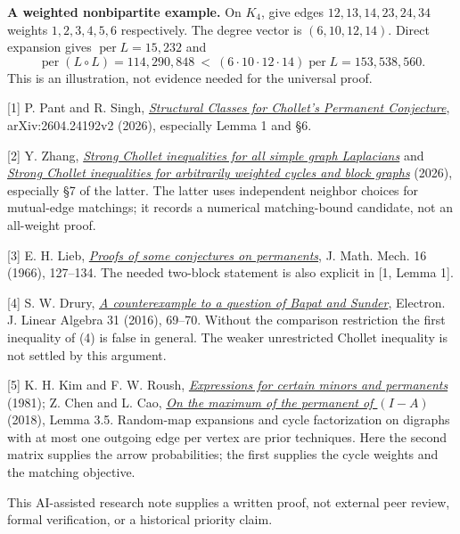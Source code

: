 \documentclass[11pt]{article}
\newcommand{\shead}[1]{\par\vspace{4pt}{\large\bfseries\sffamily\color{ink}#1}\par}
\newcommand{\per}{\operatorname{per}}
\begin{document}
\textbf{A weighted nonbipartite example.} On $K_4$, give edges $12,13,14,23,24,34$ weights $1,2,3,4,5,6$ respectively. The degree vector is $(6,10,12,14)$. Direct expansion gives $\per L=15{,}232$ and
\[
 \per(L\circ L)=114{,}290{,}848
 \ <\ (6\cdot10\cdot12\cdot14)\per L=153{,}538{,}560 .
\]
This is an illustration, not evidence needed for the universal proof.
\shead{Sources and limits}
{\small
[1] P. Pant and R. Singh, \href{https://arxiv.org/html/2604.24192v2}{\emph{Structural Classes for Chollet's Permanent Conjecture}}, arXiv:2604.24192v2 (2026), especially Lemma 1 and \S6.

[2] Y. Zhang, \href{https://github.com/mxym/math/tree/main/preprints/all-graph-chollet-2026-10}{\emph{Strong Chollet inequalities for all simple graph Laplacians}} and \href{https://github.com/mxym/math/blob/main/research/weighted-cycle-chollet/PAPER.md}{\emph{Strong Chollet inequalities for arbitrarily weighted cycles and block graphs}} (2026), especially \S7 of the latter. The latter uses independent neighbor choices for mutual-edge matchings; it records a numerical matching-bound candidate, not an all-weight proof.

[3] E. H. Lieb, \href{https://doi.org/10.1512/iumj.1967.16.16008}{\emph{Proofs of some conjectures on permanents}}, J. Math. Mech. 16 (1966), 127--134. The needed two-block statement is also explicit in [1, Lemma 1].

[4] S. W. Drury, \href{https://doi.org/10.13001/1081-3810.3178}{\emph{A counterexample to a question of Bapat and Sunder}}, Electron. J. Linear Algebra 31 (2016), 69--70. Without the comparison restriction the first inequality of (4) is false in general. The weaker unrestricted Chollet inequality is not settled by this argument.

[5] K. H. Kim and F. W. Roush, \href{https://doi.org/10.1016/0024-3795(81)90090-2}{\emph{Expressions for certain minors and permanents}} (1981); Z. Chen and L. Cao, \href{https://arxiv.org/pdf/1801.00225}{\emph{On the maximum of the permanent of $(I-A)$}} (2018), Lemma 3.5. Random-map expansions and cycle factorization on digraphs with at most one outgoing edge per vertex are prior techniques. Here the second matrix supplies the arrow probabilities; the first supplies the cycle weights and the matching objective.

This AI-assisted research note supplies a written proof, not external peer review, formal verification, or a historical priority claim.}
\end{document}
